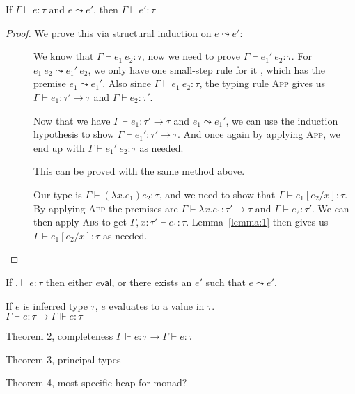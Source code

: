 \begin{theorem}[Preservation]
  If $\Gamma \vdash e : \tau$ and $e \leadsto e'$, then $\Gamma \vdash e' : \tau$
\end{theorem}

\begin{proof}
  We prove this via structural induction on $e \leadsto e'$:
  \begin{description}
  \item[] We know that
    $\Gamma \vdash e_1 \ e_2 : \tau$, now we need to prove
    $\Gamma \vdash e_1' \ e_2 : \tau$. For
    $e_1 \ e_2 \leadsto e_1' \ e_2$, we only have one small-step rule for it
    , which has the premise $e_1 \leadsto e_1'$. Also since
    $\Gamma \vdash e_1 \ e_2 : \tau$, the typing rule \textsc{App} gives us
    $\Gamma \vdash e_1 : \tau' \rightarrow \tau$ and $\Gamma \vdash e_2 : \tau'$.

    Now that we have $\Gamma \vdash e_1: \tau' \rightarrow \tau$ and $e_1 \leadsto e_1'$, we can use
    the induction hypothesis to show $\Gamma \vdash e_1' : \tau' \rightarrow \tau$. And once
    again by applying \textsc{App}, we end up with $\Gamma \vdash e_1' \ e_2 :
    \tau$ as needed.

  \item[] This can be proved with the
    same method above.

  \item[] Our type is
    $\Gamma \vdash (\lambda x . e_1) e_2 : \tau$, and we need to show that
    $\Gamma \vdash e_1 [e_2 / x] : \tau$. 
    By applying \textsc{App} the premises
    are $\Gamma \vdash \lambda x . e_1 : \tau' \rightarrow \tau$ and $\Gamma \vdash e_2 : \tau'$. We can then apply
    \textsc{Abs} to get $\Gamma, x : \tau' \vdash e_1 : \tau$.
    Lemma~\ref{lemma:1} then gives us $\Gamma \vdash e_1 [e_2 / x] : \tau$ as
    needed.
    
  \end{description}
\end{proof}

\begin{theorem}[Progress]
  If $. \vdash e : \tau$ then either $e \textsf{val}$, or there exists an $e'$
  such that $e \leadsto e'$.
\end{theorem}


\begin{theorem}[Soundness]
  If $e$ is inferred type $\tau$, $e$ evaluates to a value in $\tau$. \\
  $\Gamma \vdash e : \tau \rightarrow \Gamma \Vdash e : \tau$
\end{theorem}

Theorem 2, completeness $\Gamma \Vdash e : \tau \rightarrow \Gamma \vdash e : \tau$

Theorem 3, principal types

Theorem 4, most specific heap for monad?
